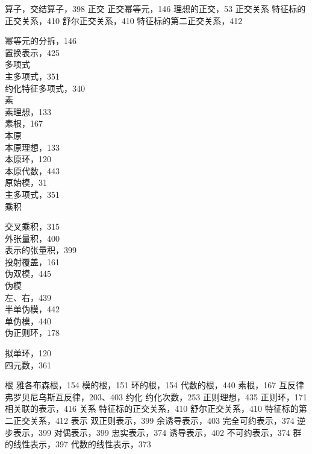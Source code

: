 
算子，交结算子，398 正交 正交幂等元，146 理想的正交，53 正交关系 特征标的正交关系，410 舒尔正交关系，410 特征标的第二正交关系，412


幂等元的分拆，146\\
置换表示，425\\
多项式\\
主多项式，351\\
约化特征多项式，340\\
素\\
素理想，133\\
素根，167\\
本原\\
本原理想，133\\
本原环，120\\
本原代数，443\\
原始模，31\\
主多项式，351\\
乘积

交叉乘积，315\\
外张量积，400\\
表示的张量积，399\\
投射覆盖，161\\
伪双模，445\\
伪模\\
左、右，439\\
半单伪模，442\\
单伪模，440\\
伪正则环，178


拟单环，120\\
四元数，361


根 雅各布森根，154 模的根，151 环的根，154 代数的根，440 素根，167 互反律 弗罗贝尼乌斯互反律，203、403 约化 约化次数，253 正则理想，435 正则环，171 相关联的表示，416 关系 特征标的正交关系，410 舒尔正交关系，410 特征标的第二正交关系，412 表示 双正则表示，399 余诱导表示，403 完全可约表示，374 逆步表示，399 对偶表示，399 忠实表示，374 诱导表示，402 不可约表示，374 群的线性表示，397 代数的线性表示，373

